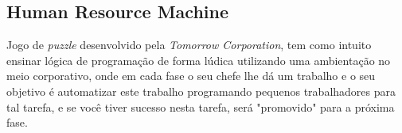 \subsection{Human Resource Machine}

Jogo de \emph{puzzle} desenvolvido pela \emph{Tomorrow Corporation}, tem como intuito ensinar lógica de programação de forma lúdica utilizando uma ambientação no meio corporativo, onde em cada fase o seu chefe lhe dá um trabalho e o seu objetivo é automatizar este trabalho programando pequenos trabalhadores para tal tarefa, e se você tiver sucesso nesta tarefa, será "promovido" para a próxima fase.
\cite{HumanResourceMachineSteam}


